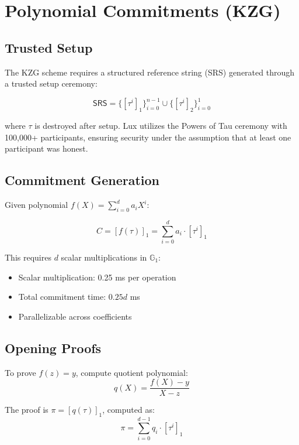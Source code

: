 \documentclass[11pt,a4paper]{article}
\theoremstyle{definition}
\begin{document}
\section{Polynomial Commitments (KZG)}

\subsection{Trusted Setup}

The KZG scheme requires a structured reference string (SRS) generated through a trusted setup ceremony:

\begin{equation}
    \mathsf{SRS} = \{[\tau^i]_1\}_{i=0}^{n-1} \cup \{[\tau^i]_2\}_{i=0}^{1}
\end{equation}

where $\tau$ is destroyed after setup. Lux utilizes the Powers of Tau ceremony with 100,000+ participants, ensuring security under the assumption that at least one participant was honest.

\subsection{Commitment Generation}

Given polynomial $f(X) = \sum_{i=0}^{d} a_i X^i$:

\begin{equation}
    C = [f(\tau)]_1 = \sum_{i=0}^{d} a_i \cdot [\tau^i]_1
\end{equation}

This requires $d$ scalar multiplications in $\mathbb{G}_1$:
\begin{itemize}
    \item Scalar multiplication: 0.25 ms per operation
    \item Total commitment time: $0.25d$ ms
    \item Parallelizable across coefficients
\end{itemize}

\subsection{Opening Proofs}

To prove $f(z) = y$, compute quotient polynomial:
\begin{equation}
    q(X) = \frac{f(X) - y}{X - z}
\end{equation}

The proof is $\pi = [q(\tau)]_1$, computed as:
\begin{equation}
    \pi = \sum_{i=0}^{d-1} q_i \cdot [\tau^i]_1
\end{equation}
\end{document}
